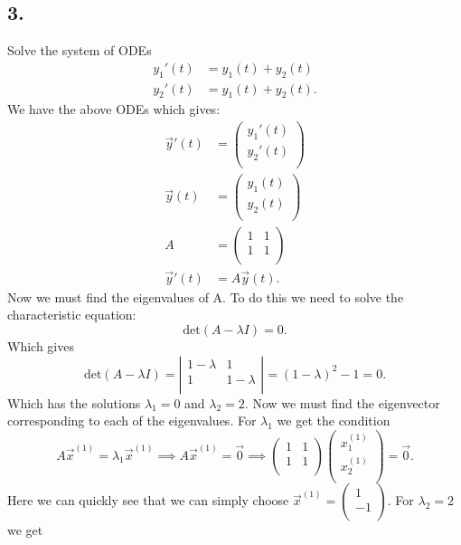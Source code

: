 \subsection*{3.} Solve the system of ODEs
\begin{align*}
  y_1'(t) &= y_1(t) + y_2(t) \\
  y_2'(t) &= y_1(t) + y_2(t)
.\end{align*}
\bigbreak
We have the above ODEs which gives:
\begin{align*}
  \Vec{y}'(t) &= \begin{pmatrix}
  y_1'(t)\\
  y_2'(t)\\
  \end{pmatrix} \\
  \Vec{y}(t) &= \begin{pmatrix}
  y_1(t)\\
  y_2(t)\\
  \end{pmatrix} \\
    A &= \begin{pmatrix}
    1 & 1\\
    1 & 1\\
    \end{pmatrix} \\
  \Vec{y}'(t) &= A \Vec{y}(t)
.\end{align*}
Now we must find the eigenvalues of A. To do this we need to solve the characteristic equation:
\[ 
\mathrm{det}(A - \lambda I) = 0
.\]
Which gives
\[ 
\mathrm{det}(A - \lambda I) = \left| \begin{array}{cc}
1 - \lambda & 1\\
1 & 1 - \lambda\\
\end{array} \right| = (1 - \lambda)^2 - 1 = 0
.\]
Which has the solutions $\lambda_1 = 0$ and $\lambda_2 = 2$. Now we must find the eigenvector corresponding to each of the eigenvalues. For $\lambda_1$ we get the condition
\[ 
A \Vec{x}^{(1)} = \lambda_1 \Vec{x}^{(1)} \implies A \Vec{x}^{(1)} = \Vec{0} \implies \begin{pmatrix}
1 & 1\\
1 & 1\\
\end{pmatrix} \begin{pmatrix}
x_1^{(1)}\\
x_2^{(1)}\\
\end{pmatrix} = \Vec{0}
.\]
Here we can quickly see that we can simply choose $\Vec{x}^{(1)} = \begin{pmatrix}
1\\
-1\\
\end{pmatrix}$. For $\lambda_2 = 2$ we get
